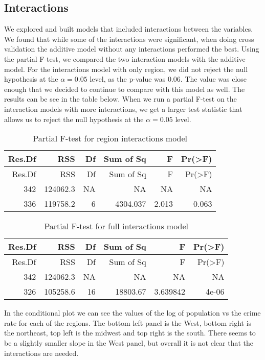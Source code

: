 \documentclass[]{article}
\begin{document}
\subsection{Interactions}\label{interactions}

We explored and built models that included interactions between the
variables. We found that while some of the interactions were
significant, when doing cross validation the additive model without any
interactions performed the best. Using the partial F-test, we compared
the two interaction models with the additive model. For the interactions
model with only region, we did not reject the null hypothesis at the
\(\alpha = 0.05\) level, as the p-value was 0.06. The value was close
enough that we decided to continue to compare with this model as well.
The results can be see in the table below. When we run a partial F-test
on the interaction models with more interactions, we get a larger test
statistic that allows us to reject the null hypothesis at the
\(\alpha = 0.05\) level.

\begin{longtable}[]{@{}rrrrrr@{}}
\caption{Partial F-test for region interactions model}\tabularnewline
\toprule
Res.Df & RSS & Df & Sum of Sq & F & Pr(\textgreater{}F)\tabularnewline
\midrule
\endfirsthead
\toprule
Res.Df & RSS & Df & Sum of Sq & F & Pr(\textgreater{}F)\tabularnewline
\midrule
\endhead
342 & 124062.3 & NA & NA & NA & NA\tabularnewline
336 & 119758.2 & 6 & 4304.037 & 2.013 & 0.063\tabularnewline
\bottomrule
\end{longtable}

\begin{longtable}[]{@{}rrrrrr@{}}
\caption{Partial F-test for full interactions model}\tabularnewline
\toprule
Res.Df & RSS & Df & Sum of Sq & F & Pr(\textgreater{}F)\tabularnewline
\midrule
\endfirsthead
\toprule
Res.Df & RSS & Df & Sum of Sq & F & Pr(\textgreater{}F)\tabularnewline
\midrule
\endhead
342 & 124062.3 & NA & NA & NA & NA\tabularnewline
326 & 105258.6 & 16 & 18803.67 & 3.639842 & 4e-06\tabularnewline
\bottomrule
\end{longtable}

In the conditional plot we can see the values of the log of population
vs the crime rate for each of the regions. The bottom left panel is the
West, bottom right is the northeast, top left is the midwest and top
right is the south. There seems to be a slightly smaller slope in the
West panel, but overall it is not clear that the interactions are
needed.
\end{document}
